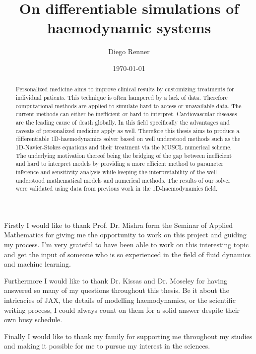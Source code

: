 \documentclass[a4paper, oneside]{discothesis}
\title{On differentiable simulations of haemodynamic systems}
\author{Diego Renner}
\institute{Dep. of Mathematics \\[2pt]
ETH Zürich}
\date{\today}
\begin{document}
\frontmatter %
\maketitle
\cleardoublepage

\begin{acknowledgements}
	Firstly I would like to thank Prof. Dr. Mishra form the Seminar of Applied Mathematics for giving me the opportunity to work on this project and guiding my process.	
	I'm very grateful to have been able to work on this interesting topic and get the input of someone who is so experienced in the field of fluid dynamics and machine learning.

	Furthermore I would like to thank Dr. Kissas and Dr. Moseley for having answered so many of my questions throughout this thesis.
	Be it about the intricacies of JAX, the details of modelling haemodynamics, or the scientific writing process, I could always count on them for a solid answer despite their own busy schedule.

	Finally I would like to thank my family for supporting me throughout my studies and making it possible for me to pursue my interest in the sciences.

\end{acknowledgements}


\begin{abstract}
	Personalized medicine aims to improve clinical results by customizing treatments for individual patients.
	This technique is often hampered by a lack of data.
	Therefore computational methods are applied to simulate hard to access or unavailable data.
	The current methods can either be inefficient or hard to interpret.
	Cardiovascular diseases are the leading cause of death globally.
	In this field specifically the advantages and caveats of personalized medicine apply as well.
	Therefore this thesis aims to produce a differentiable 1D-haemodynamics solver based on well understood methods such as the 1D-Navier-Stokes equations and their treatment via the MUSCL numerical scheme.
	The underlying motivation thereof being the bridging of the gap between inefficient and hard to interpret models by providing a more efficient method to parameter inference and sensitivity analysis while keeping the interpretability of the well understood mathematical models and numerical methods.
	The results of our solver were validated using data from previous work in the 1D-haemodynamics field.

\end{abstract}
\end{document}

